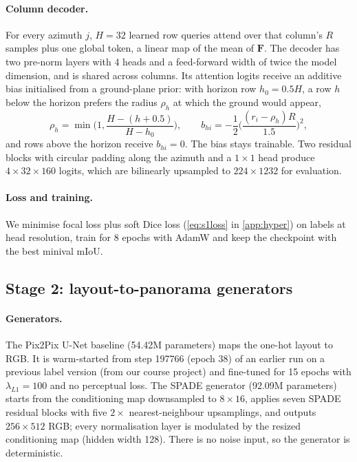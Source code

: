 \documentclass[11pt]{article}
\begin{document}
\paragraph{Column decoder.} For every azimuth $j$, $H=32$ learned row queries attend over that column's $R$
samples plus one global token, a linear map of the mean of $\mathbf{F}$. The decoder has two pre-norm layers
with 4 heads and a feed-forward width of twice the model dimension, and is shared across columns. Its
attention logits receive an additive bias initialised from a ground-plane prior: with horizon row
$h_0=0.5H$, a row $h$ below the horizon prefers the radius $\rho_h$ at which the ground would appear,
\begin{equation}
  \rho_h=\min\!\Big(1,\frac{H-(h+0.5)}{H-h_0}\Big),\qquad
  b_{hi}=-\frac{1}{2}\Big(\frac{(r_i-\rho_h)R}{1.5}\Big)^{2},
  \label{eq:prior}
\end{equation}
and rows above the horizon receive $b_{hi}=0$. The bias stays trainable. Two residual blocks with circular padding along the
azimuth and a $1\times1$ head produce $4\times32\times160$ logits, which are bilinearly upsampled to
$224\times1232$ for evaluation.

\paragraph{Loss and training.} We minimise focal loss \cite{lin2017focal} plus soft Dice loss
(\cref{eq:s1loss} in \cref{app:hyper}) on labels at head resolution, train for 8 epochs with AdamW and keep the
checkpoint with the best minival mIoU.

\subsection{Stage 2: layout-to-panorama generators}
\label{sec:stage2}

\paragraph{Generators.} The Pix2Pix U-Net baseline \cite{isola2017pix2pix} (54.42M parameters) maps the
one-hot layout to RGB. It is warm-started from step \num{197766} (epoch 38) of an earlier run on a previous
label version (from our course project) and fine-tuned for 15 epochs with $\lambda_{L1}=100$ and no perceptual loss. The SPADE generator
\cite{park2019spade} (92.09M parameters) starts from the conditioning map downsampled to $8\times16$, applies
seven SPADE residual blocks with five $2\times$ nearest-neighbour upsamplings, and outputs $256\times512$ RGB;
every normalisation layer is modulated by the resized conditioning map (hidden width 128). There is no noise
input, so the generator is deterministic.
\end{document}

